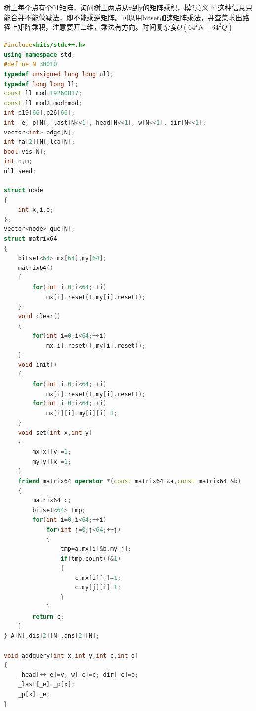 \documentclass[UTF8,a4paper,titlepage]{ctexart}
\begin{document}
树上每个点有个01矩阵，询问树上两点从x到y的矩阵乘积，模2意义下
这种信息只能合并不能做减法，即不能乘逆矩阵。可以用bitset加速矩阵乘法，并查集求出路径上矩阵乘积，注意要开二维，乘法有方向。时间复杂度$O(64^{2}N+64^{2}Q)$
\begin{lstlisting}[language=C++]
#include<bits/stdc++.h>
using namespace std;
#define N 30010
typedef unsigned long long ull;
typedef long long ll;
const ll mod=19260817;
const ll mod2=mod*mod;
int p19[66],p26[66];
int _e,_p[N],_last[N<<1],_head[N<<1],_w[N<<1],_dir[N<<1];
vector<int> edge[N];
int fa[2][N],lca[N];
bool vis[N];
int n,m;
ull seed;

struct node
{
    int x,i,o;
};
vector<node> que[N];
struct matrix64
{
    bitset<64> mx[64],my[64];
    matrix64()
    {
        for(int i=0;i<64;++i)
            mx[i].reset(),my[i].reset();
    }
    void clear()
    {
        for(int i=0;i<64;++i)
            mx[i].reset(),my[i].reset();
    }
    void init()
    {
        for(int i=0;i<64;++i)
            mx[i].reset(),my[i].reset();
        for(int i=0;i<64;++i)
            mx[i][i]=my[i][i]=1;
    }
    void set(int x,int y)
    {
        mx[x][y]=1;
        my[y][x]=1;
    }
    friend matrix64 operator *(const matrix64 &a,const matrix64 &b)
    {
        matrix64 c;
        bitset<64> tmp;
        for(int i=0;i<64;++i)
            for(int j=0;j<64;++j)
            {
                tmp=a.mx[i]&b.my[j];
                if(tmp.count()&1)
                {
                    c.mx[i][j]=1;
                    c.my[j][i]=1;
                }
            }
        return c;
    }
} A[N],dis[2][N],ans[2][N];

void addquery(int x,int y,int c,int o)
{
    _head[++_e]=y;_w[_e]=c;_dir[_e]=o;
    _last[_e]=_p[x];
    _p[x]=_e;
}


\end{lstlisting}
\end{document}
